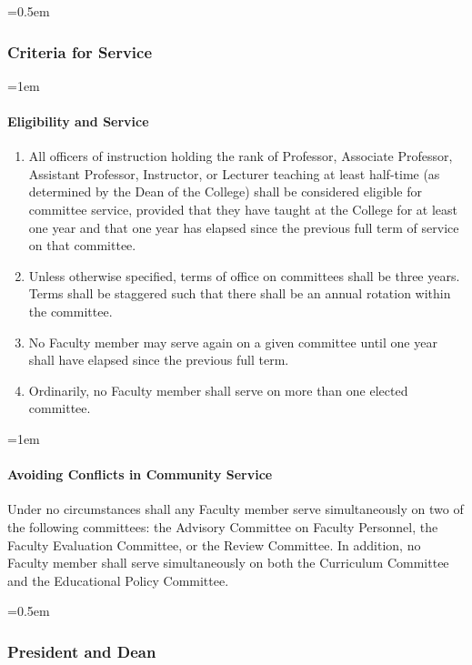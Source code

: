 \documentclass{manual}
\let\oldsubsubsection\subsubsection
\renewcommand\subsubsection{\leftskip=0.5em\oldsubsubsection}
\let\oldparagraph\paragraph
\renewcommand\paragraph{\leftskip=1em\oldparagraph}
\newcommand{\itemLevelA}{\alph*.}
\newcommand{\itemRefA}{\alph*}
\begin{document}
\subsubsection{Criteria for Service}
\paragraph{Eligibility and Service}

\begin{enumerate}[label=\itemLevelA,ref=\itemRefA]
\item All officers of instruction holding the rank of Professor, Associate Professor, Assistant Professor, Instructor, or Lecturer teaching at least half-time (as determined by the Dean of the College) shall be considered eligible for committee service, provided that they have taught at the College for at least one year and that one year has elapsed since the previous full term of service on that committee.

\item Unless otherwise specified, terms of office on committees shall be three years. Terms shall be staggered such that there shall be an annual rotation within the committee.

\item No Faculty member may serve again on a given committee until one year shall have elapsed since the previous full term.

\item Ordinarily, no Faculty member shall serve on more than one elected committee.
\end{enumerate}

\paragraph{Avoiding Conflicts in Community Service}
Under no circumstances shall any Faculty member serve simultaneously on two of the following committees: the Advisory Committee on Faculty Personnel, the Faculty Evaluation Committee, or the Review Committee. In addition, no Faculty member shall serve simultaneously on both the Curriculum Committee and the Educational Policy Committee.

\subsubsection{President and Dean}
\end{document}
